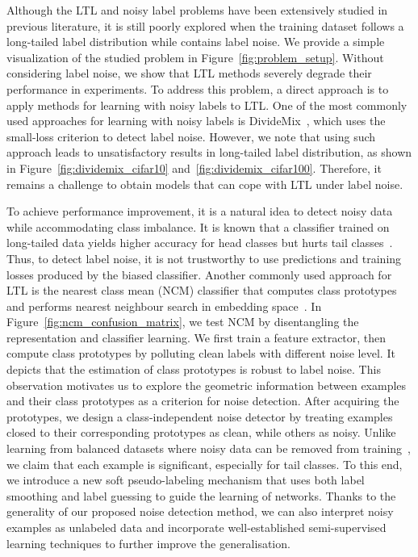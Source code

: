 \documentclass{article}
\begin{document}
Although the LTL and noisy label problems have been extensively studied in previous literature, it is still poorly explored when the training dataset follows a long-tailed label distribution while contains label noise. We provide a simple visualization of the studied problem in Figure~\ref{fig:problem_setup}. Without considering label noise, we show that LTL methods severely degrade their performance in experiments. To address this problem, a direct approach is to apply methods for learning with noisy labels to LTL. One of the most commonly used approaches for learning with noisy labels is DivideMix~\cite{li2020dividemix}, which uses the small-loss criterion to detect label noise. However, we note that using such approach leads to unsatisfactory results in long-tailed label distribution, as shown in Figure~\ref{fig:dividemix_cifar10} and~\ref{fig:dividemix_cifar100}. Therefore, it remains a challenge to obtain models that can cope with LTL under label noise. 

To achieve performance improvement, it is a natural idea to detect noisy data while accommodating class imbalance. It is known that a classifier trained on long-tailed data yields higher accuracy for head classes but hurts tail classes~\cite{DBLP:conf/iclr/KangXRYGFK20}. Thus, to detect label noise, it is not trustworthy to use predictions and training losses produced by the biased classifier. Another commonly used approach for LTL is the nearest class mean (NCM) classifier that computes class prototypes and performs nearest neighbour search in embedding space~\cite{DBLP:conf/iclr/KangXRYGFK20}. In Figure~\ref{fig:ncm_confusion_matrix}, we test NCM by disentangling the representation and classifier learning. We first train a feature extractor, then compute class prototypes by polluting clean labels with different noise level. It depicts that the estimation of class prototypes is robust to label noise. This observation motivates us to explore the geometric information between examples and their class prototypes as a criterion for noise detection. After acquiring the prototypes, we design a class-independent noise detector by treating examples closed to their corresponding prototypes as clean, while others as noisy. Unlike learning from balanced datasets where noisy data can be removed from training~\cite{pleiss2020identifying}, we claim that each example is significant, especially for tail classes. To this end, we introduce a new soft pseudo-labeling mechanism that uses both label smoothing and label guessing to guide the learning of networks. Thanks to the generality of our proposed noise detection method, we can also interpret noisy examples as unlabeled data and incorporate well-established semi-supervised learning techniques to further improve the generalisation.
\end{document}

